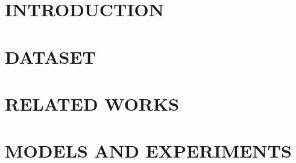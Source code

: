\documentclass[BTech]{iitddiss}
\newcommand{\eat}[1]{}
\begin{document}
\eat{

\chapter*{\centerline{NOTATION}}
\addcontentsline{toc}{chapter}{NOTATION}

\begin{singlespace}
\begin{tabbing}
xxxxxxxxxxx \= xxxxxxxxxxxxxxxxxxxxxxxxxxxxxxxxxxxxxxxxxxxxxxxx \kill
\textbf{$r$}  \> Radius, $m$ \\
\textbf{$\alpha$}  \> Angle of thesis in degrees \\
\textbf{$\beta$}   \> Flight path in degrees \\
\end{tabbing}
\end{singlespace}

\pagebreak}
\clearpage




\chapter{INTRODUCTION}
\label{chap:intro}


\chapter{DATASET}
\label{chap:dataset}


\chapter{RELATED WORKS}
\label{chap:related-works}


\chapter{MODELS AND EXPERIMENTS}
\label{chap:models}


% 
\end{document}
